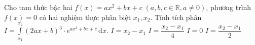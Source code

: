 \begin{ex}%
	Cho tam thức bậc hai $f(x)=ax^2+bx+c\;(a,b,c \in \mathbb{R}, a \ne 0)$, phương trình $f(x)=0$ có hai nghiệm thực phân biệt $x_1,x_2$. Tính tích phân $I=\displaystyle \int\limits_{x_1}^{x_2}(2ax+b)^3 \cdot e^{ax^2+bx+c}\mathrm{\,d}x$.
	\choice
	{$I=x_2-x_1$}
	{$I=\dfrac{x_2-x_1}{4}$}
	{\True $I=0$}
	{$I=\dfrac{x_2-x_1}{2}$}
\end{ex}
